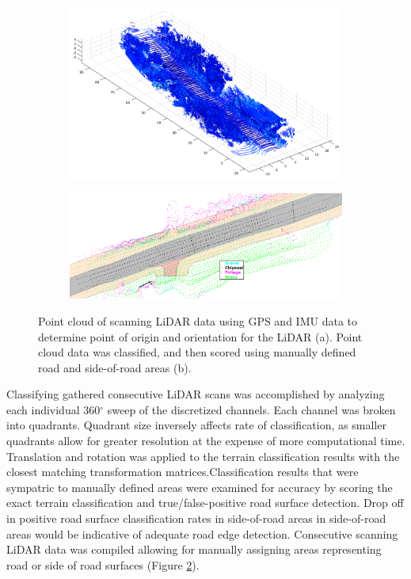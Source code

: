 \documentclass[journal,onecolumn]{IEEEtran}
\begin{document}
	\begin{figure}[H]
		\centering
		\begin{subfigure}{0.45\textwidth}
			\centering
			\includegraphics[width=0.95\linewidth]{figures/Compiled_PCD}
			\caption[C]{}
			\label{fig:Compiled_PCD}
		\end{subfigure}
		\begin{subfigure}{0.45\textwidth}
			\centering
			\includegraphics[width=0.95\linewidth]{figures/short_chip_redux}
			\caption[]{}
			\label{fig:Classified_Areas_PCD}
		\end{subfigure}
		\caption[Compiled and Classified Point Cloud Data]{Point cloud of scanning LiDAR data using GPS and IMU data to determine point of origin and orientation for the LiDAR (a). Point cloud data was classified, and then scored using manually defined road and side-of-road areas (b).}
		\label{fig:Combined_Classified_PCD}
	\end{figure}
	
	{Classifying gathered consecutive LiDAR scans was accomplished by analyzing each individual 360$^{\circ}$ sweep of the discretized channels. Each channel was broken into quadrants. Quadrant size inversely affects rate of classification, as smaller quadrants allow for greater resolution at the expense of more computational time. Translation and rotation was applied to the terrain classification results with the closest matching transformation matrices.Classification results that were sympatric to manually defined areas were examined for accuracy by scoring the exact terrain classification and true/false-positive road surface detection. Drop off in positive road surface classification rates in side-of-road areas in side-of-road areas would be indicative of adequate road edge detection. Consecutive scanning LiDAR data was compiled allowing for manually assigning areas representing road or side of road surfaces (Figure \ref{fig:Classified_Areas_PCD}).}
	
\end{document}

